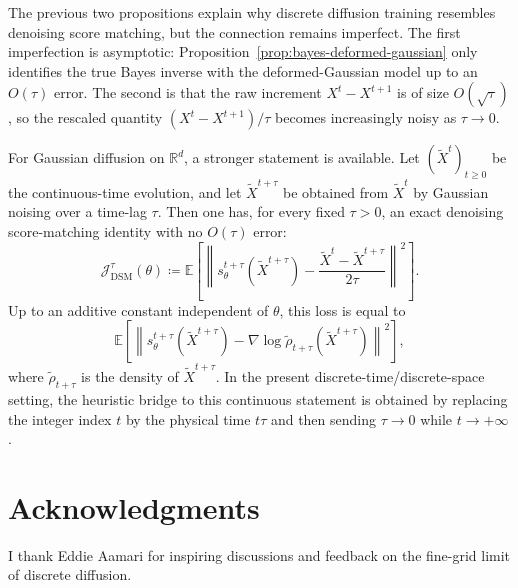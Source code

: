 \documentclass[11pt]{article}
\begin{document}
The previous two propositions explain why discrete diffusion training resembles denoising score matching, but the connection remains imperfect. The first imperfection is asymptotic: Proposition~\ref{prop:bayes-deformed-gaussian} only identifies the true Bayes inverse with the deformed-Gaussian model up to an $O(\tau)$ error. The second is that the raw increment $X^t-X^{t+1}$ is of size $O(\sqrt{\tau})$, so the rescaled quantity $(X^t-X^{t+1})/\tau$ becomes increasingly noisy as $\tau\to0$.

For Gaussian diffusion on $\mathbb R^d$, a stronger statement is available. Let $(\widetilde X^t)_{t\ge0}$ be the continuous-time evolution, and let $\widetilde X^{t+\tau}$ be obtained from $\widetilde X^t$ by Gaussian noising over a time-lag $\tau$. Then one has, for every fixed $\tau>0$, an exact denoising score-matching identity with no $O(\tau)$ error:
\[
\mathcal J_{\mathrm{DSM}}^\tau(\theta)
\coloneqq
\mathbb E\!\left[
\left\|
s_\theta^{t+\tau}(\widetilde X^{t+\tau})
-\frac{\widetilde X^t-\widetilde X^{t+\tau}}{2\tau}
\right\|^2
\right].
\]
Up to an additive constant independent of $\theta$, this loss is equal to
\[
\mathbb E\!\left[
\left\|
s_\theta^{t+\tau}(\widetilde X^{t+\tau})
-\nabla\log \widetilde \rho_{t+\tau}(\widetilde X^{t+\tau})
\right\|^2
\right],
\]
where $\widetilde \rho_{t+\tau}$ is the density of $\widetilde X^{t+\tau}$. In the present discrete-time/discrete-space setting, the heuristic bridge to this continuous statement is obtained by replacing the integer index $t$ by the physical time $t\tau$ and then sending $\tau\to0$ while $t\to+\infty$.

\section*{Acknowledgments}
I thank Eddie Aamari for inspiring discussions and feedback on the fine-grid limit of discrete diffusion.



\end{document}
